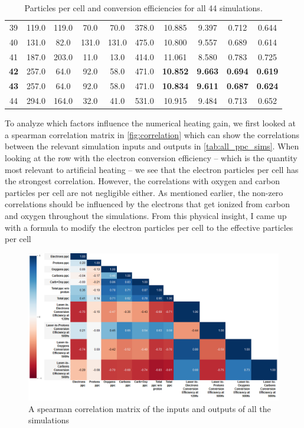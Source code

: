 \begin{table}
\begin{tabular}{c|c|c|c|c|c|c|c|c|c}
		39 & 119.0 & 119.0 & 70.0 & 70.0 & 378.0 & 10.885 & 9.397 & 0.712 & 0.644\\
		40 & 131.0 & 82.0 & 131.0 & 131.0 & 475.0 & 10.800 & 9.557 & 0.689 & 0.614\\
		41 & 187.0 & 203.0 & 11.0 & 13.0 & 414.0 & 11.061 & 8.580 & 0.783 & 0.725\\
		\textbf{42} & 257.0 & 64.0 & 92.0 & 58.0 & 471.0 & \textbf{10.852} & \textbf{9.663} & \textbf{0.694} & \textbf{0.619}\\
		\textbf{43} & 257.0 & 64.0 & 92.0 & 58.0 & 471.0 & \textbf{10.834} & \textbf{9.611} & \textbf{0.687} & \textbf{0.624}\\
		44 & 294.0 & 164.0 & 32.0 & 41.0 & 531.0 & 10.915 & 9.484 & 0.713 & 0.652\\ \hline
	\end{tabular}
	\caption{Particles per cell and conversion efficiencies for all 44 simulations.}
	\label{tab:all_ppc_sims}
\end{table}
To analyze which factors influence the numerical heating gain, we first looked at a spearman correlation matrix in \autoref{fig:correlation} which can show the correlations between the relevant simulation inputs and outputs in \autoref{tab:all_ppc_sims}. When looking at the row with the electron conversion efficiency -- which is the quantity most relevant to artificial heating -- we see that the electron particles per cell has the strongest correlation. However, the correlations with oxygen and carbon particles per cell are not negligible either. As mentioned earlier, the non-zero correlations should be influenced by the electrons that get ionized from carbon and oxygen throughout the simulations. From this physical insight, I came up with a formula to modify the electron particles per cell to the effective particles per cell

\begin{figure}
	\includegraphics[width=0.9\linewidth]{planning/images/arber/corr_matrix.png}
	\caption{A spearman correlation matrix of the inputs and outputs of all the simulations} \label{fig:correlation}
\end{figure}


